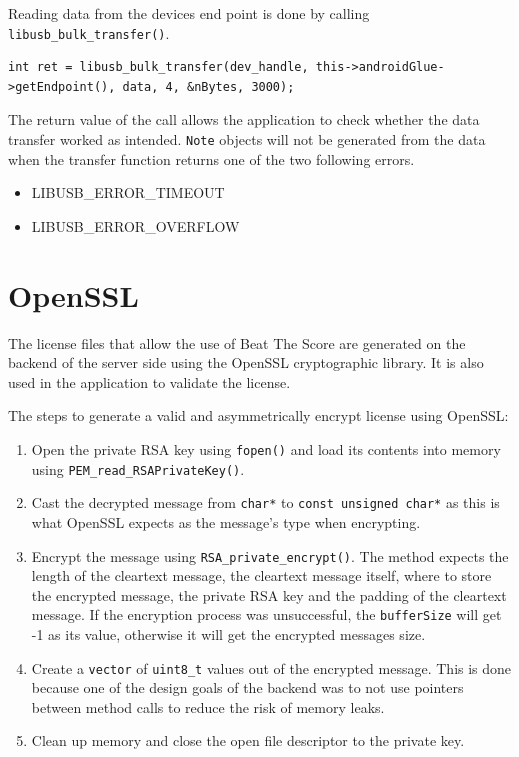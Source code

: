 Reading data from the devices end point is done by calling {\tt libusb\_bulk\_transfer()}.
\begin{lstlisting}
int ret = libusb_bulk_transfer(dev_handle, this->androidGlue->getEndpoint(), data, 4, &nBytes, 3000);
\end{lstlisting}
The return value of the call allows the application to check whether the data transfer worked as intended. 
{\tt Note} objects will not be generated from the data when the transfer function returns one of the two following errors.
\begin{itemize}
\item LIBUSB\_ERROR\_TIMEOUT
\item LIBUSB\_ERROR\_OVERFLOW
\end{itemize}

\section[OpenSSL \textsuperscript{Neumayer}]{OpenSSL}
\label{sec:OpenSSL}
The license files that allow the use of Beat The Score are generated on the backend of the server side using the OpenSSL cryptographic library. It is also used in the application to validate the license.

The steps to generate a valid and asymmetrically encrypt license using OpenSSL:
\begin{enumerate}
\item Open the private RSA key using {\tt fopen()} and load its contents into memory using {\tt PEM\_read\_RSAPrivateKey()}.

\item Cast the decrypted message from {\tt char*} to {\tt const unsigned char*} as this is what OpenSSL expects as the message's type when encrypting.

\item Encrypt the message using {\tt RSA\_private\_encrypt()}. The method expects the length of the cleartext message, the cleartext message itself, where to store the encrypted message, the private RSA key and the padding of the cleartext message. If the encryption process was unsuccessful, the {\tt bufferSize} will get -1 as its value, otherwise it will get the encrypted messages size.

\item Create a {\tt vector} of {\tt uint8\_t} values out of the encrypted message. This is done because one of the design goals of the backend was to not use pointers between method calls to reduce the risk of memory leaks.

\item Clean up memory and close the open file descriptor to the private key.
\end{enumerate}

